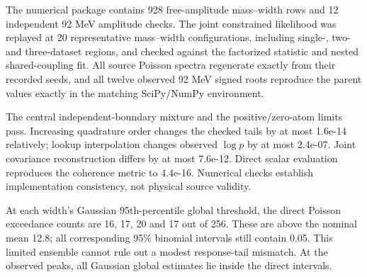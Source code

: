 The numerical package contains 928 free-amplitude mass--width rows and 12 independent 92 MeV amplitude checks. The joint constrained likelihood was replayed at 20 representative mass--width configurations, including single-, two- and three-dataset regions, and checked against the factorized statistic and nested shared-coupling fit. All source Poisson spectra regenerate exactly from their recorded seeds, and all twelve observed 92 MeV signed roots reproduce the parent values exactly in the matching SciPy/NumPy environment.

The central independent-boundary mixture and the positive/zero-atom limits pass. Increasing quadrature order changes the checked tails by at most 1.6e-14 relatively; lookup interpolation changes observed $\log p$ by at most 2.4e-07. Joint covariance reconstruction differs by at most 7.6e-12. Direct scalar evaluation reproduces the coherence metric to 4.4e-16. Numerical checks establish implementation consistency, not physical source validity.

At each width's Gaussian 95th-percentile global threshold, the direct Poisson exceedance counts are 16, 17, 20 and 17 out of 256. These are above the nominal mean 12.8; all corresponding 95\% binomial intervals still contain 0.05. This limited ensemble cannot rule out a modest response-tail mismatch. At the observed peaks, all Gaussian global estimates lie inside the direct intervals.
